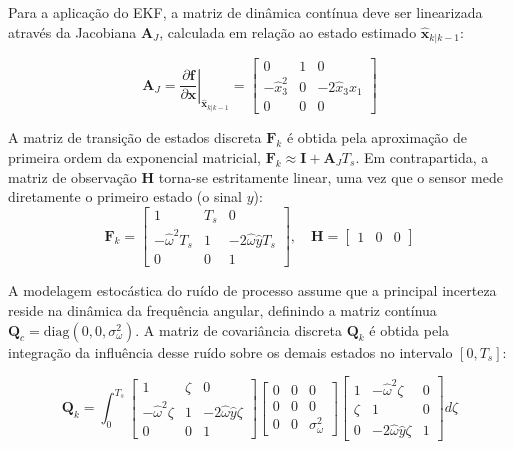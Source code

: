 \documentclass[a4paper,12pt]{article}
\begin{document}
Para a aplicação do EKF, a matriz de dinâmica contínua deve ser linearizada através da Jacobiana $\mathbf{A}_J$, calculada em relação ao estado estimado $\hat{\mathbf{x}}_{k|k-1}$:

\begin{equation}
    \mathbf{A}_J = \left. \frac{\partial \mathbf{f}}{\partial \mathbf{x}} \right|_{\hat{\mathbf{x}}_{k|k-1}} = \begin{bmatrix} 0 & 1 & 0 \\ -\hat{x}_3^2 & 0 & -2\hat{x}_3 \hat{x}_1 \\ 0 & 0 & 0 \end{bmatrix}
    \label{eq:mod4_Jacobiana_A}
\end{equation}

A matriz de transição de estados discreta $\mathbf{F}_k$ é obtida pela aproximação de primeira ordem da exponencial matricial, $\mathbf{F}_k \approx \mathbf{I} + \mathbf{A}_J T_s$. Em contrapartida, a matriz de observação $\mathbf{H}$ torna-se estritamente linear, uma vez que o sensor mede diretamente o primeiro estado (o sinal $y$):
\begin{equation}
    \mathbf{F}_k = \begin{bmatrix} 1 & T_s & 0 \\ -\hat{\omega}^2 T_s & 1 & -2\hat{\omega} \hat{y} T_s \\ 0 & 0 & 1 \end{bmatrix}, \quad \mathbf{H} = \begin{bmatrix} 1 & 0 & 0 \end{bmatrix}
    \label{eq:mod4_matrizes_finais}
\end{equation}

A modelagem estocástica do ruído de processo assume que a principal incerteza reside na dinâmica da frequência angular, definindo a matriz contínua $\mathbf{Q}_c = \text{diag}(0, 0, \sigma_{\omega}^2)$. A matriz de covariância discreta $\mathbf{Q}_k$ é obtida pela integração da influência desse ruído sobre os demais estados no intervalo $[0, T_s]$:

\begin{equation}
    \mathbf{Q}_k = \int_{0}^{T_s} \begin{bmatrix} 1 & \zeta & 0 \\ -\hat{\omega}^2 \zeta & 1 & -2\hat{\omega}\hat{y}\zeta \\ 0 & 0 & 1 \end{bmatrix} \begin{bmatrix} 0 & 0 & 0 \\ 0 & 0 & 0 \\ 0 & 0 & \sigma_{\omega}^2 \end{bmatrix} \begin{bmatrix} 1 & -\hat{\omega}^2 \zeta & 0 \\ \zeta & 1 & 0 \\ 0 & -2\hat{\omega}\hat{y}\zeta & 1 \end{bmatrix} d\zeta
\end{equation}
\end{document}
